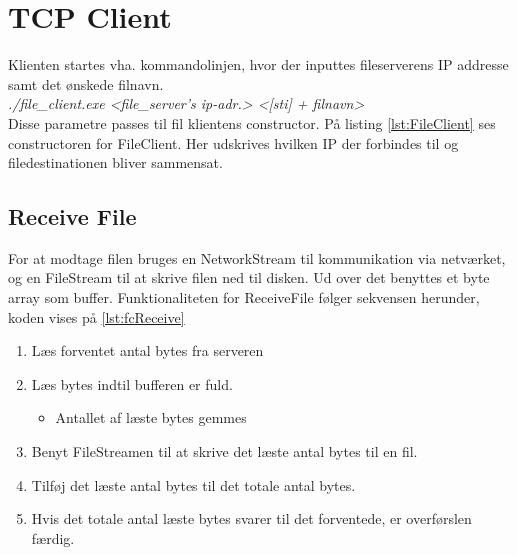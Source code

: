 \section{TCP Client}
Klienten startes vha. kommandolinjen, hvor der inputtes fileserverens IP addresse samt det ønskede filnavn. \\ \textit{./file\_client.exe  <file\_server’s ip-adr.> <[sti] + filnavn>} \\

Disse parametre passes til fil klientens constructor. På listing \ref{lst:FileClient} ses constructoren for FileClient. Her udskrives hvilken IP der forbindes til og filedestinationen bliver sammensat.


\subsection{Receive File}
For at modtage filen bruges en NetworkStream til kommunikation via netværket, og en FileStream til at skrive filen ned til disken. Ud over det benyttes et byte array som buffer. Funktionaliteten for ReceiveFile følger sekvensen herunder, koden vises på \ref{lst:fcReceive}

\begin{enumerate}
	\item Læs forventet antal bytes fra serveren
	\item Læs bytes indtil bufferen er fuld.
	\begin{itemize}
		\item Antallet af læste bytes gemmes
	\end{itemize}
	\item Benyt FileStreamen til at skrive det læste antal bytes til en fil.
	\item Tilføj det læste antal bytes til det totale antal bytes.
	\item Hvis det totale antal læste bytes svarer til det forventede, er overførslen færdig.
\end{enumerate}
\newpage
